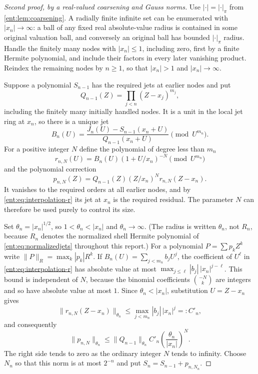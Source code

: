 \documentclass[11pt]{article}
\theoremstyle{plain}
\theoremstyle{plain}
\theoremstyle{plain}
\theoremstyle{definition}
\theoremstyle{definition}
\theoremstyle{definition}
\theoremstyle{definition}
\theoremstyle{remark}
\begin{document}
\begin{proof}[Second proof, by a real-valued coarsening and Gauss norms]
Use $|\cdot|=|\cdot|_\pi$ from \cref{ent:lem:coarsening}. A radially finite
infinite set can be enumerated with $|x_n|\to\infty$: a ball of any fixed
real absolute-value radius is contained in some original valuation ball, and
conversely an original ball has bounded $|\cdot|_\pi$ radius. Handle the
finitely many nodes with $|x_n|\le1$, including zero, first by a finite
Hermite polynomial, and include their factors in every later vanishing
product. Reindex the remaining nodes by $n\ge1$, so that $|x_n|>1$ and
$|x_n|\to\infty$.

Suppose a polynomial $S_{n-1}$ has the required jets at earlier nodes and put
\[
 Q_{n-1}(Z)=\prod_{j<n}(Z-x_j)^{m_j},
\]
including the finitely many initially handled nodes. It is a unit in the
local jet ring at $x_n$, so there is a unique jet
\[
 B_n(U)=\frac{J_n(U)-S_{n-1}(x_n+U)}{Q_{n-1}(x_n+U)}
              \pmod{U^{m_n}}.
\]
For a positive integer $N$ define the polynomial of degree less than $m_n$
\begin{equation}\label{ent:eq:interpolation-r}
 r_{n,N}(U)=B_n(U)(1+U/x_n)^{-N}\pmod{U^{m_n}}
\end{equation}
and the polynomial correction
\begin{equation}\label{ent:eq:interpolation-p}
 p_{n,N}(Z)=Q_{n-1}(Z)(Z/x_n)^N r_{n,N}(Z-x_n).
\end{equation}
It vanishes to the required orders at all earlier nodes, and by
\eqref{ent:eq:interpolation-r} its jet at $x_n$ is the required residual. The
parameter $N$ can therefore be used purely to control its size.

Set $\theta_n=|x_n|^{1/2}$, so $1<\theta_n<|x_n|$ and $\theta_n\to\infty$.
(The radius is written $\theta_n$, not $R_n$, because $R_n$ denotes the
normalized shell Hermite polynomial of \eqref{ent:eq:normalizedjets}
throughout this report.) For a polynomial
$P=\sum p_kZ^k$ write $\|P\|_R=\max_k|p_k|R^k$. If
$B_n(U)=\sum_{j<m_n}b_jU^j$, the coefficient of $U^\ell$ in
\eqref{ent:eq:interpolation-r} has absolute value at most
$\max_{j\le\ell}|b_j|\,|x_n|^{j-\ell}$. This bound is independent of $N$,
because the binomial coefficients $\binom{-N}{k}$ are integers and so have
absolute value at most $1$. Since $\theta_n<|x_n|$, substitution $U=Z-x_n$
gives
\[
 \|r_{n,N}(Z-x_n)\|_{\theta_n}
 \le\max_{j<m_n}|b_j|\,|x_n|^j=:C'_n,
\]
and consequently
\begin{equation}\label{ent:eq:damping}
 \|p_{n,N}\|_{\theta_n}
 \le \|Q_{n-1}\|_{\theta_n} C'_n
          \left(\frac{\theta_n}{|x_n|}\right)^N.
\end{equation}
The right side tends to zero as the ordinary integer $N$ tends to infinity.
Choose $N_n$ so that this norm is at most $2^{-n}$ and put
$S_n=S_{n-1}+p_{n,N_n}$.


\end{proof}
\end{document}
